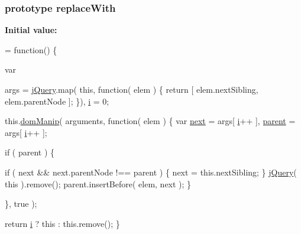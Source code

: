 \subsubsection[{replace\+With}]{ {\bf prototype} replace\+With}\label{jquery-1_810_82-vsdoc_8js_adefc41a8d3d9f7f534df4b2171d70141}
{\bfseries Initial value\+:}
\begin{DoxyCode}
= \textcolor{keyword}{function}() \{


        var
            
            args = \hyperlink{jquery-1_810_82-vsdoc_8js_add5237586d970a38a81f990e8eb28c6c}{jQuery}.map( \textcolor{keyword}{this}, \textcolor{keyword}{function}( elem ) \{
                \textcolor{keywordflow}{return} [ elem.nextSibling, elem.parentNode ];
            \}),
            \hyperlink{_bibabook_2_scripts_2respond_8min_8js_a5e25b1d1bed9ab5f3174b76d6a722180}{i} = 0;

        
        this.\hyperlink{jquery-1_810_82-vsdoc_8js_a00a63bd312ef048290dc1755ccb8bae4}{domManip}( arguments, \textcolor{keyword}{function}( elem ) \{
            var \hyperlink{jquery-1_810_82-vsdoc_8js_a61213ec31ab21de6b8fbe75332157524}{next} = args[ \hyperlink{_bibabook_2_scripts_2respond_8min_8js_a5e25b1d1bed9ab5f3174b76d6a722180}{i}++ ],
                \hyperlink{jquery-1_810_82-vsdoc_8js_aed9b5e7a755bcccb282f9b06c00a6822}{parent} = args[ \hyperlink{_bibabook_2_scripts_2respond_8min_8js_a5e25b1d1bed9ab5f3174b76d6a722180}{i}++ ];

            \textcolor{keywordflow}{if} ( parent ) \{
                
                \textcolor{keywordflow}{if} ( next && next.parentNode !== parent ) \{
                    next = this.nextSibling;
                \}
                \hyperlink{jquery-1_810_82-vsdoc_8js_add5237586d970a38a81f990e8eb28c6c}{jQuery}( \textcolor{keyword}{this} ).\textcolor{keyword}{remove}();
                parent.insertBefore( elem, next );
            \}
        
        \}, true );

        
        \textcolor{keywordflow}{return} \hyperlink{_bibabook_2_scripts_2respond_8min_8js_a5e25b1d1bed9ab5f3174b76d6a722180}{i} ? \textcolor{keyword}{this} : this.\textcolor{keyword}{remove}();
    \}
\end{DoxyCode}
\hypertarget{jquery-1_810_82-vsdoc_8js_a44dd45019a8a101b7494ad2d837d1bd6}{}
